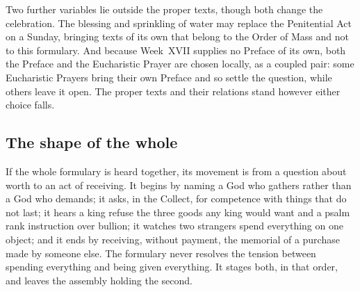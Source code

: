 Two further variables lie outside the proper texts, though both change the celebration. The blessing and sprinkling of water may replace the Penitential Act on a Sunday, bringing texts of its own that belong to the Order of Mass and not to this formulary. And because Week~XVII supplies no Preface of its own, both the Preface and the Eucharistic Prayer are chosen locally, as a coupled pair: some Eucharistic Prayers bring their own Preface and so settle the question, while others leave it open. The proper texts and their relations stand however either choice falls.

\subsection*{The shape of the whole}

If the whole formulary is heard together, its movement is from a question about worth to an act of receiving. It begins by naming a God who gathers rather than a God who demands; it asks, in the Collect, for competence with things that do not last; it hears a king refuse the three goods any king would want and a psalm rank instruction over bullion; it watches two strangers spend everything on one object; and it ends by receiving, without payment, the memorial of a purchase made by someone else. The formulary never resolves the tension between spending everything and being given everything. It stages both, in that order, and leaves the assembly holding the second.
\label{triptych:brief-synthesis:end}
\clearpage
